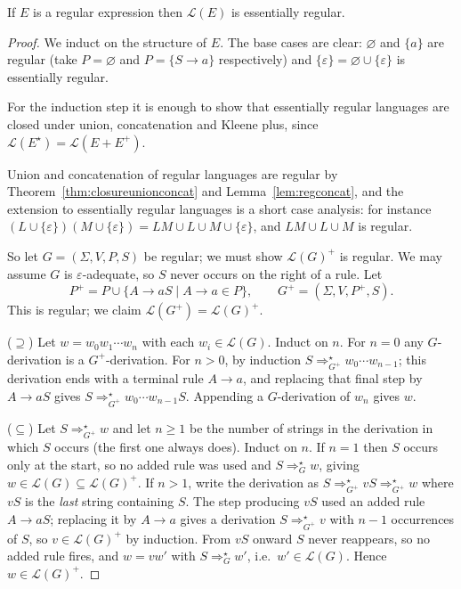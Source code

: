 \documentclass[a4paper]{scrartcl}
\newcommand{\lang}{\mathcal{L}}
\newcommand{\eps}{\varepsilon}
\begin{document}
\begin{theorem}\label{thm:regextoreg}
	If $E$ is a regular expression then $\lang(E)$ is essentially regular.
\end{theorem}

\begin{proof}
	We induct on the structure of $E$. The base cases are clear: $\varnothing$ and $\{a\}$ are regular (take $P = \varnothing$ and $P = \{S \to a\}$ respectively) and $\{\eps\} = \varnothing \cup \{\eps\}$ is essentially regular.

	For the induction step it is enough to show that essentially regular languages are closed under union, concatenation and Kleene plus, since $\lang(E^\star) = \lang(E + E^+)$.

	Union and concatenation of regular languages are regular by Theorem~\ref{thm:closureunionconcat} and Lemma~\ref{lem:regconcat}, and the extension to essentially regular languages is a short case analysis: for instance $(L\cup\{\eps\})(M\cup\{\eps\}) = LM \cup L \cup M \cup \{\eps\}$, and $LM \cup L \cup M$ is regular.

	So let $G = (\Sigma, V, P, S)$ be regular; we must show $\lang(G)^+$ is regular. We may assume $G$ is $\eps$-adequate, so $S$ never occurs on the right of a rule. Let
	$$P^+ = P \cup \{A \to aS \mid A \to a \in P\}, \qquad G^+ = (\Sigma, V, P^+, S).$$
	This is regular; we claim $\lang(G^+) = \lang(G)^+$.

	($\supseteq$) Let $w = w_0w_1\cdots w_n$ with each $w_i \in \lang(G)$. Induct on $n$. For $n = 0$ any $G$-derivation is a $G^+$-derivation. For $n > 0$, by induction $S \Rightarrow_{G^+}^\star w_0\cdots w_{n-1}$; this derivation ends with a terminal rule $A \to a$, and replacing that final step by $A \to aS$ gives $S \Rightarrow_{G^+}^\star w_0\cdots w_{n-1}S$. Appending a $G$-derivation of $w_n$ gives $w$.

	($\subseteq$) Let $S \Rightarrow_{G^+}^\star w$ and let $n \geq 1$ be the number of strings in the derivation in which $S$ occurs (the first one always does). Induct on $n$. If $n = 1$ then $S$ occurs only at the start, so no added rule was used and $S \Rightarrow_G^\star w$, giving $w \in \lang(G) \subseteq \lang(G)^+$. If $n > 1$, write the derivation as $S \Rightarrow_{G^+}^\star vS \Rightarrow_{G^+}^\star w$ where $vS$ is the \emph{last} string containing $S$. The step producing $vS$ used an added rule $A \to aS$; replacing it by $A \to a$ gives a derivation $S \Rightarrow_{G^+}^\star v$ with $n - 1$ occurrences of $S$, so $v \in \lang(G)^+$ by induction. From $vS$ onward $S$ never reappears, so no added rule fires, and $w = vw'$ with $S \Rightarrow_G^\star w'$, i.e.\ $w' \in \lang(G)$. Hence $w \in \lang(G)^+$.
\end{proof}
\end{document}
